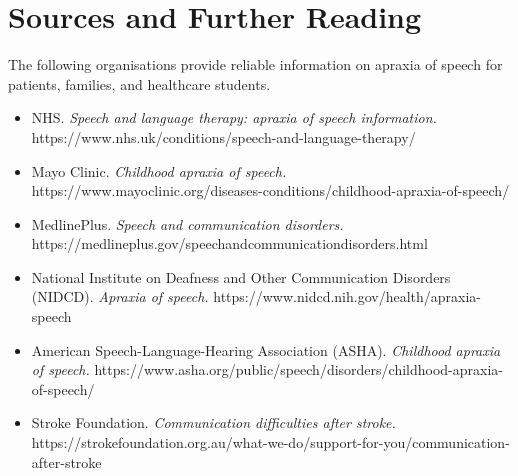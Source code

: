 \section*{Sources and Further Reading}
The following organisations provide reliable information on apraxia of speech for patients, families, and healthcare students.

\begin{itemize}
    \item NHS. \textit{Speech and language therapy: apraxia of speech information.} https://www.nhs.uk/conditions/speech-and-language-therapy/
    \item Mayo Clinic. \textit{Childhood apraxia of speech.} https://www.mayoclinic.org/diseases-conditions/childhood-apraxia-of-speech/
    \item MedlinePlus. \textit{Speech and communication disorders.} https://medlineplus.gov/speechandcommunicationdisorders.html
    \item National Institute on Deafness and Other Communication Disorders (NIDCD). \textit{Apraxia of speech.} https://www.nidcd.nih.gov/health/apraxia-speech
    \item American Speech-Language-Hearing Association (ASHA). \textit{Childhood apraxia of speech.} https://www.asha.org/public/speech/disorders/childhood-apraxia-of-speech/
    \item Stroke Foundation. \textit{Communication difficulties after stroke.} https://strokefoundation.org.au/what-we-do/support-for-you/communication-after-stroke
\end{itemize}

